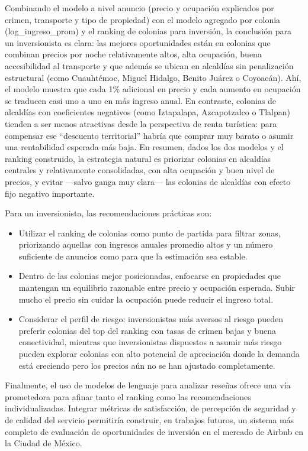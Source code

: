 \documentclass[12pt]{article}
\begin{document}
\begin{enumerate}
Combinando el modelo a nivel anuncio (precio y ocupación explicados por crimen, transporte y tipo de propiedad) con el modelo agregado por colonia (log\_ingreso\_prom) y el ranking de colonias para inversión, la conclusión para un inversionista es clara: las mejores oportunidades están en colonias que combinan precios por noche relativamente altos, alta ocupación, buena accesibilidad al transporte y que además se ubican en alcaldías sin penalización estructural (como Cuauhtémoc, Miguel Hidalgo, Benito Juárez o Coyoacán). Ahí, el modelo muestra que cada 1\% adicional en precio y cada aumento en ocupación se traducen casi uno a uno en más ingreso anual. En contraste, colonias de alcaldías con coeficientes negativos (como Iztapalapa, Azcapotzalco o Tlalpan) tienden a ser menos atractivas desde la perspectiva de renta turística: para compensar ese “descuento territorial” habría que comprar muy barato o asumir una rentabilidad esperada más baja. En resumen, dados los dos modelos y el ranking construido, la estrategia natural es priorizar colonias en alcaldías centrales y relativamente consolidadas, con alta ocupación y buen nivel de precios, y evitar —salvo ganga muy clara— las colonias de alcaldías con efecto fijo negativo importante.

\end{enumerate}

Para un inversionista, las recomendaciones prácticas son:

\begin{itemize}
  \item Utilizar el ranking de colonias como punto de partida para filtrar zonas, priorizando aquellas con ingresos anuales promedio altos y un número suficiente de anuncios como para que la estimación sea estable.
  \item Dentro de las colonias mejor posicionadas, enfocarse en propiedades que mantengan un equilibrio razonable entre precio y ocupación esperada. Subir mucho el precio sin cuidar la ocupación puede reducir el ingreso total.
  \item Considerar el perfil de riesgo: inversionistas más aversos al riesgo pueden preferir colonias del top del ranking con tasas de crimen bajas y buena conectividad, mientras que inversionistas dispuestos a asumir más riesgo pueden explorar colonias con alto potencial de apreciación donde la demanda está creciendo pero los precios aún no se han ajustado completamente.
\end{itemize}

Finalmente, el uso de modelos de lenguaje para analizar reseñas ofrece una vía prometedora para afinar tanto el ranking como las recomendaciones individualizadas. Integrar métricas de satisfacción, de percepción de seguridad y de calidad del servicio permitiría construir, en trabajos futuros, un sistema más completo de evaluación de oportunidades de inversión en el mercado de Airbnb en la Ciudad de México.
\end{document}
